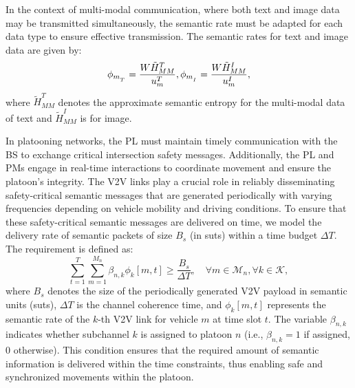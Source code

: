 \documentclass[10pt, lettersize,journal]{IEEEtran}
\begin{document}
	In the context of multi-modal communication, where both text and image data may be transmitted simultaneously, the semantic rate must be adapted for each data type to ensure effective transmission. The semantic rates for text and image data are given by:
	\begin{equation}\label{eq13}
		{\phi _{{m_{_T}}}} = \frac{{W\tilde H_{MM}^T}}{{u_m^T}},{\rm{   }}{\phi _{{m_{_I}}}} = \frac{{W\tilde H_{MM}^I}}{{u_m^I}},
	\end{equation}
	where ${\tilde H_{MM}^T}$ denotes the approximate semantic entropy for the multi-modal data of text and ${\tilde H_{MM}^I}$ is for image.
	
	In platooning networks, the PL must maintain timely communication with the BS to exchange critical intersection safety messages. Additionally, the PL and PMs engage in real-time interactions to coordinate movement and ensure the platoon's integrity. The V2V links play a crucial role in reliably disseminating safety-critical semantic messages that are generated periodically with varying frequencies depending on vehicle mobility and driving conditions.
	To ensure that these safety-critical semantic messages are delivered on time, we model the delivery rate of semantic packets of size \(B_s\) (in suts) within a time budget \(\Delta T\). The requirement is defined as:
	\begin{equation}\label{eq16}
		\sum_{t=1}^T \sum_{m=1}^{M_{n}} {{\beta _{n,k}}} \phi_{k}[m, t] \geq \frac{B_s}{\Delta T}, \quad \forall m \in \mathcal{M}_{n}, \forall k \in \mathcal{K},
	\end{equation}
	where \(B_s\) denotes the size of the periodically generated V2V payload in semantic units (suts), \(\Delta T\) is the channel coherence time, and \(\phi_{k}[m, t]\) represents the semantic rate of the \(k\)-th V2V link for vehicle \(m\) at time slot \(t\). The variable \({{\beta _{n,k}}}\) indicates whether subchannel \(k\) is assigned to platoon \(n\) (i.e., \({{\beta _{n,k}}} = 1\) if assigned, $0$ otherwise). This condition ensures that the required amount of semantic information is delivered within the time constraints, thus enabling safe and synchronized movements within the platoon.
	
\end{document}
